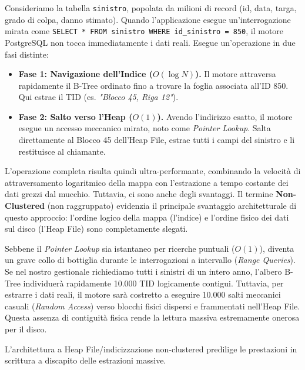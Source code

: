 \begin{example}
Consideriamo la tabella \texttt{sinistro}, popolata da milioni di record (id, data, targa, grado di colpa, danno stimato).
Quando l'applicazione esegue un'interrogazione mirata come \texttt{SELECT * FROM sinistro WHERE id\_sinistro = 850}, il motore PostgreSQL non tocca immediatamente i dati reali. Esegue un'operazione in due fasi distinte:
\begin{itemize}
    \item \textbf{Fase 1: Navigazione dell'Indice ($O(\log N)$).} Il motore attraversa rapidamente il B-Tree ordinato fino a trovare la foglia associata all'ID 850. Qui estrae il TID (es. \textit{"Blocco 45, Riga 12"}).
    \item \textbf{Fase 2: Salto verso l'Heap ($O(1)$).} Avendo l'indirizzo esatto, il motore esegue un accesso meccanico mirato, noto come \textit{Pointer Lookup}. Salta direttamente al Blocco 45 dell'Heap File, estrae tutti i campi del sinistro e li restituisce al chiamante.
\end{itemize}
\end{example}

L'operazione completa risulta quindi ultra-performante, combinando la velocità di attraversamento logaritmico della mappa con l'estrazione a tempo costante dei dati grezzi dal mucchio. Tuttavia, ci sono anche degli svantaggi. 
Il termine \textbf{Non-Clustered} (non raggruppato) evidenzia il principale svantaggio architetturale di questo approccio: l'ordine logico della mappa (l'indice) e l'ordine fisico dei dati sul disco (l'Heap File) sono completamente slegati. 

Sebbene il \textit{Pointer Lookup} sia istantaneo per ricerche puntuali ($O(1)$), diventa un grave collo di bottiglia durante le interrogazioni a intervallo (\textit{Range Queries}). Se nel nostro gestionale richiediamo tutti i sinistri di un intero anno, l'albero B-Tree individuerà rapidamente 10.000 TID logicamente contigui. Tuttavia, per estrarre i dati reali, il motore sarà costretto a eseguire 10.000 salti meccanici casuali (\textit{Random Access}) verso blocchi fisici dispersi e frammentati nell'Heap File. Questa assenza di contiguità fisica rende la lettura massiva estremamente onerosa per il disco. 

\begin{tip}
    L'architettura a Heap File/indicizzazione non-clustered predilige le prestazioni in scrittura a discapito delle estrazioni massive.
\end{tip}

